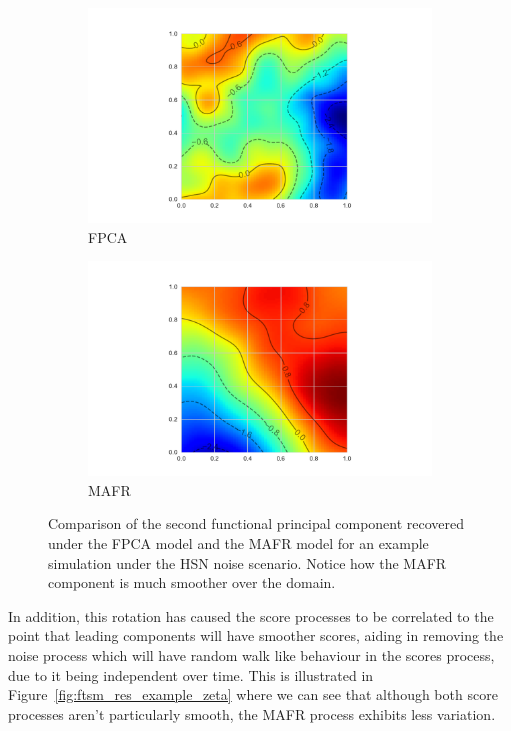 \begin{figure}[!htbp]
	\centering
	\begin{subfigure}[b]{0.45\textwidth}
		\includegraphics[width=\textwidth]{ftsm_res_fpc_example_fpca}
		\caption{FPCA}
	\end{subfigure}             
	\begin{subfigure}[b]{0.45\textwidth}
		\includegraphics[width=\textwidth]{ftsm_res_fpc_example_mafr}
		\caption{MAFR}
	\end{subfigure}
	\caption[Comparison of the second functional principal component under FPCA and MAFR models.]{Comparison of the second functional principal component recovered under the FPCA model and the MAFR model for an example simulation under the HSN noise scenario. Notice how the MAFR component is much smoother over the domain.}
	\label{fig:ftsm_res_example_fpc}
\end{figure}

In addition, this rotation has caused the score processes to be correlated to the point that leading components will have smoother scores, aiding in removing the noise process which will have random walk like behaviour in the scores process, due to it being independent over time.
This is illustrated in Figure~\ref{fig:ftsm_res_example_zeta} where we can see that although both score processes aren't particularly smooth, the MAFR process exhibits less variation. 

